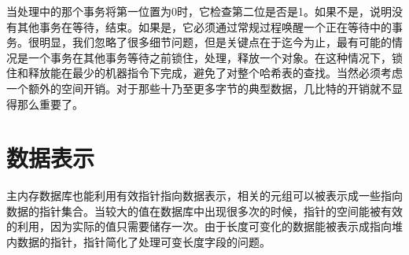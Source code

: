 \documentclass[translation]{zjutreport}
\begin{document}
当处理中的那个事务将第一位置为0时，它检查第二位是否是1。如果不是，说明没有其他事务在等待，结束。如果是，它必须通过常规过程唤醒一个正在等待中的事务。很明显，我们忽略了很多细节问题，但是关键点在于迄今为止，最有可能的情况是一个事务在其他事务等待之前锁住，处理，释放一个对象。在这种情况下，锁住和释放能在最少的机器指令下完成，避免了对整个哈希表的查找。当然必须考虑一个额外的空间开销。对于那些十乃至更多字节的典型数据，几比特的开销就不显得那么重要了。

\section{数据表示}
主内存数据库也能利用有效指针指向数据表示，相关的元组可以被表示成一些指向数据的指针集合。当较大的值在数据库中出现很多次的时候，指针的空间能被有效的利用，因为实际的值只需要储存一次。由于长度可变化的数据能被表示成指向堆内数据的指针，指针简化了处理可变长度字段的问题。

\backmatter %
\endgroup %



\clearpage %

\nocite{*}                                   %




\end{document}
